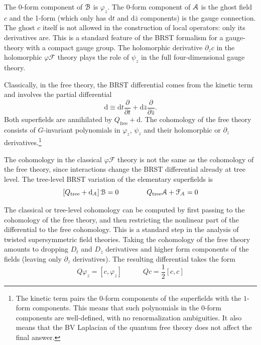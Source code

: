 \documentclass[11pt,a4paper]{article}
\begin{document}
The 0-form component of ${\cal B}$ is $\varphi_z$.  The 0-form component of ${\cal A}$ is the ghost field $c$ and the 1-form (which only has ${\mathrm d}t$ and ${\mathrm d} \bar z$ components) is the gauge connection. The ghost $c$ itself is not allowed in the construction of local operators: only its derivatives are. This is a standard feature of the BRST formalism for a gauge-theory with a compact gauge group. 
The holomorphic derivative $\partial_z c$ in the holomorphic $\varphi {\mathcal {F}}$ theory plays the role of $\psi_z$ in the full four-dimensional gauge theory.

Classically, in the free theory, the BRST differential comes from the kinetic term and involves the partial differential
\begin{equation}
\mathrm{d} \equiv {\mathrm d}t \frac{\partial}{\partial t}+ {\mathrm d} \bar z \frac{\partial}{\partial \bar z}.
\end{equation}
Both superfields are annihilated by $Q_{\mathrm{free}} + \mathrm{d}$. The cohomology of the free theory consists of 
$G$-invariant polynomials in $\varphi_z$, $\psi_z$ and their holomorphic or $\partial_z$ derivatives.\footnote{The kinetic term pairs the $0$-form components 
of the superfields with the $1$-form components. This means that such polynomials in the $0$-form components are well-defined, with no renormalization ambiguities. It also means that the BV Laplacian of the quantum free theory does not affect the final answer. }

The cohomology in the classical $\varphi \mathcal F$ theory is not the same as the cohomology of the free theory, since 
interactions change the BRST differential already at tree level. The tree-level BRST variation of the elementary superfields is
\begin{equation}
\left[Q_{\mathrm{tree}} + \mathrm{d}_{\cal A} \right] {\cal B} = 0 \qquad \qquad Q_{\mathrm{tree}} {\cal A} + {\cal F}_{\cal A} = 0
\end{equation}

The classical or tree-level cohomology can be computed by first passing to the cohomology of the free theory, and then restricting the nonlinear part of the differential 
to the free cohomology. This is a standard step in the analysis of twisted supersymmetric field theories.
Taking the cohomology of the free theory amounts to  
dropping $D_t$ and $D_{\bar z}$ derivatives and higher form components of the fields (leaving only $\partial_z$ derivatives).   
The resulting differential takes the form 
\begin{equation}
Q \varphi_z = [c,\varphi_z] \quad \qquad Q c = \frac12 [c,c]
\end{equation}
\end{document}
